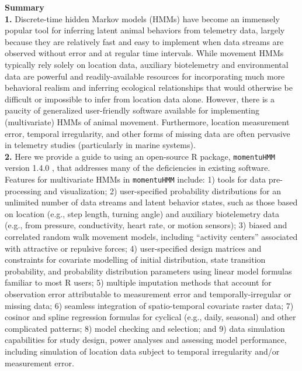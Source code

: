 \documentclass[12pt]{article}\usepackage[]{graphicx}\usepackage[]{color}
\begin{document}
\noindent \textbf{Summary}\\
\textbf{1.} Discrete-time hidden Markov models (HMMs) have become an immensely popular tool for inferring latent animal behaviors from telemetry data, largely because they are relatively fast and easy to implement when data streams are observed without error and at regular time intervals. While movement HMMs typically rely solely on location data, auxiliary biotelemetry and environmental data are powerful and readily-available resources for incorporating much more behavioral realism and inferring ecological relationships that would otherwise be difficult or impossible to infer from location data alone.  However, there is a paucity of generalized user-friendly software available for implementing (multivariate) HMMs of animal movement. Furthermore, location measurement error, temporal irregularity, and other forms of missing data are often pervasive in telemetry studies (particularly in marine systems).\\ %
\textbf{2.} Here we provide a guide to using an open-source R package, \verb|momentuHMM| version 1.4.0%
, that addresses many of the deficiencies in existing software.  Features for multivariate HMMs in \verb|momentuHMM| include: 1) tools for data pre-processing and visualization; 2) user-specified probability distributions for an unlimited number of data streams and latent behavior states, such as those based on location (e.g., step length, turning angle) and auxiliary biotelemetry data (e.g., from pressure, conductivity, heart rate, or motion sensors); 3) biased and correlated random walk movement models, including ``activity centers'' associated with attractive or repulsive forces; 4) user-specified design matrices and constraints for covariate modelling of initial distribution, state transition probability, and probability distribution parameters using linear model formulas familiar to most R users; 5) multiple imputation methods that account for observation error attributable to measurement error and temporally-irregular or missing data; 6) seamless integration of spatio-temporal covariate raster data; 7) cosinor and spline regression formulas for cyclical (e.g., daily, seasonal) and other complicated patterns; 8) model checking and selection; and 9) data simulation capabilities for study design, power analyses and assessing model performance, including simulation of location data subject to temporal irregularity and/or measurement error.\\ 
\end{document}
